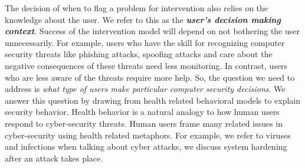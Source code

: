 The decision of when to flag a problem for intervention also relies on the knowledge about the user. 
We refer to this as the \textbf{\textit{user's decision making context}}. 
Success of the intervention model will depend on not bothering the user unnecessarily. 
For example, users who have the skill for recognizing computer security threats like phishing attacks, spoofing attacks and care about the negative consequences of these threats need less monitoring. 
In contrast, users who are less aware of the threats require more help. 
So, the question we need to address is \textit{what type of users make particular computer security decisions}. 
We answer this question by drawing from health related behavioral models to explain security behavior. 
Health behavior is a natural analogy to how human users respond to cyber-security threats. 
Human users frame many related issues in cyber-security using health related metaphors. 
For example, we refer to viruses and infections when talking about cyber attacks, we discuss system hardening after an attack takes place. 

